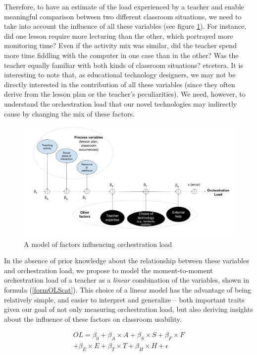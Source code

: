 \documentclass[10pt,journal,compsoc]{IEEEtran}
\begin{document}
Therefore, to have an estimate of the load experienced by a teacher and enable meaningful comparison between two different classroom situations, we need to take into account the influence of all these variables (see figure \ref{fig:model}). For instance, did one lesson require more lecturing than the other, which portrayed more monitoring time? Even if the activity mix was similar, did the teacher spend more time fiddling with the computer in one case than in the other? Was the teacher equally familiar with both kinds of classroom situations? etcetera. It is interesting to note that, as educational technology designers, we may not be directly interested in the contribution of all these variables (since they often derive from the lesson plan or the teacher's peculiarities). We need, however, to understand the orchestration load that our novel technologies may indirectly cause by changing the mix of these factors.


\begin{figure}[!t]
\centering
\includegraphics[width=\linewidth]{img/ModelFactorsOL}
\caption{A model of factors influencing orchestration load}
\label{fig:model}
\end{figure}

In the absence of prior knowledge about the relationship between these variables and orchestration load, we propose to model the moment-to-moment orchestration load of a teacher as a \textit{linear} combination of the variables, shown in formula (\ref{formOLScat}). This choice of a linear model has the advantage of being relatively simple, and easier to interpret and generalize -- both important traits given our goal of not only measuring orchestration load, but also deriving insights about the influence of these factors on classroom usability.

\begin{multline}
\label{formOLScat}
OL = \beta_0 + \beta_A\times{}A + \beta_S\times{}S + \beta_F\times{}F \\ + \beta_E\times{}E + \beta_T\times{}T + \beta_H\times{}H + \epsilon
\end{multline}
\end{document}
